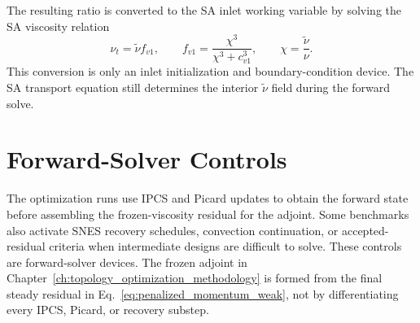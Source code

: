The resulting ratio is converted to the SA inlet working variable by solving the SA viscosity relation
\begin{equation}
	\nu_t = \tilde{\nu} f_{v1},
	\qquad
	f_{v1}=\frac{\chi^3}{\chi^3+c_{v1}^3},
	\qquad
	\chi=\frac{\tilde{\nu}}{\nu}.
	\label{eq:sa_viscosity_ratio_conversion}
\end{equation}
This conversion is only an inlet initialization and boundary-condition device. The SA transport equation still determines the interior $\tilde{\nu}$ field during the forward solve.

\section{Forward-Solver Controls}
\label{sec:app_topology_forward_controls}
The optimization runs use IPCS and Picard updates to obtain the forward state before assembling the frozen-viscosity residual for the adjoint. Some benchmarks also activate SNES recovery schedules, convection continuation, or accepted-residual criteria when intermediate designs are difficult to solve. These controls are forward-solver devices. The frozen adjoint in Chapter~\ref{ch:topology_optimization_methodology} is formed from the final steady residual in Eq.~\ref{eq:penalized_momentum_weak}, not by differentiating every IPCS, Picard, or recovery substep.
